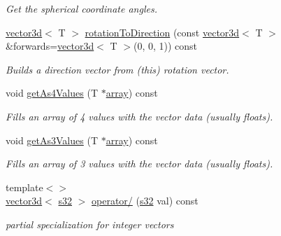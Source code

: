 \begin{DoxyCompactItemize}
\begin{DoxyCompactList}\small\item\em Get the spherical coordinate angles. \end{DoxyCompactList}\item 
\hyperlink{classirr_1_1core_1_1vector3d}{vector3d}$<$ T $>$ \hyperlink{classirr_1_1core_1_1vector3d_a53d222e7aace72513210bddb2b25376f}{rotation\+To\+Direction} (const \hyperlink{classirr_1_1core_1_1vector3d}{vector3d}$<$ T $>$ \&forwards=\hyperlink{classirr_1_1core_1_1vector3d}{vector3d}$<$ T $>$(0, 0, 1)) const
\begin{DoxyCompactList}\small\item\em Builds a direction vector from (this) rotation vector. \end{DoxyCompactList}\item 
void \hyperlink{classirr_1_1core_1_1vector3d_aa661941fdf725c83dc560b15232fdf6e}{get\+As4\+Values} (T $\ast$\hyperlink{classirr_1_1core_1_1array}{array}) const
\begin{DoxyCompactList}\small\item\em Fills an array of 4 values with the vector data (usually floats). \end{DoxyCompactList}\item 
void \hyperlink{classirr_1_1core_1_1vector3d_af9e676bc10fe34e49e544373a33d7d21}{get\+As3\+Values} (T $\ast$\hyperlink{classirr_1_1core_1_1array}{array}) const
\begin{DoxyCompactList}\small\item\em Fills an array of 3 values with the vector data (usually floats). \end{DoxyCompactList}\item 
\mbox{\label{classirr_1_1core_1_1vector3d_a7597f07300c420146117f2e5854153c2}} 
{\footnotesize template$<$$>$ }\\\hyperlink{classirr_1_1core_1_1vector3d}{vector3d}$<$ \hyperlink{namespaceirr_ac66849b7a6ed16e30ebede579f9b47c6}{s32} $>$ \hyperlink{classirr_1_1core_1_1vector3d_a7597f07300c420146117f2e5854153c2}{operator/} (\hyperlink{namespaceirr_ac66849b7a6ed16e30ebede579f9b47c6}{s32} val) const
\begin{DoxyCompactList}\small\item\em partial specialization for integer vectors \end{DoxyCompactList}\end{DoxyCompactItemize}
